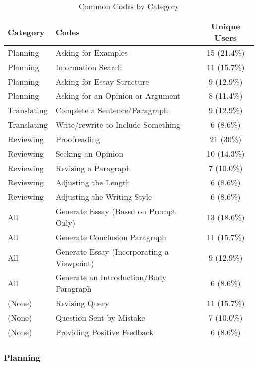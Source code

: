 \documentclass[manuscript,screen,acmsmall]{acmart}
\begin{document}
    
\begin{table}[t]
\centering
\caption{Common Codes by Category}
\begin{tabular}{|l|l|c|}
\hline
Category & Codes & Unique Users \\
\hline
Planning & Asking for Examples & 15 (21.4\%) \\
Planning & Information Search & 11 (15.7\%)\\
Planning & Asking for Essay Structure & 9 (12.9\%) \\
Planning & Asking for an Opinion or Argument & 8 (11.4\%) \\
\hline
Translating & Complete a Sentence/Paragraph & 9 (12.9\%) \\
Translating & Write/rewrite to Include Something & 6 (8.6\%) \\
\hline
Reviewing & Proofreading & 21 (30\%) \\
Reviewing & Seeking an Opinion & 10 (14.3\%) \\
Reviewing & Revising a Paragraph & 7 (10.0\%) \\
Reviewing & Adjusting the Length & 6 (8.6\%) \\
Reviewing & Adjusting the Writing Style & 6 (8.6\%) \\
\hline
All & Generate Essay (Based on Prompt Only) & 13 (18.6\%) \\
All & Generate Conclusion Paragraph & 11 (15.7\%) \\
All & Generate Essay (Incorporating a Viewpoint) & 9 (12.9\%) \\
All & Generate an Introduction/Body Paragraph & 6 (8.6\%) \\
\hline
(None) & Revising Query & 11 (15.7\%) \\
(None) & Question Sent by Mistake & 7 (10.0\%) \\
(None) & Providing Positive Feedback & 6 (8.6\%) \\
\hline
\end{tabular}
\label{tab:common_codes}
\end{table}

    \subsubsection{Planning}
\end{document}
